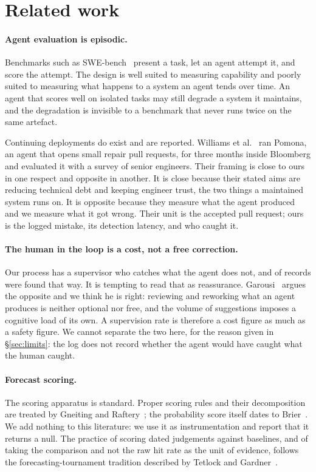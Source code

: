 \documentclass[11pt,a4paper]{article}
\begin{document}
\section{Related work}\label{sec:related}

\paragraph{Agent evaluation is episodic.} Benchmarks such as
SWE-bench~\cite{jimenez2024swebench} present a task, let an agent attempt it,
and score the attempt. The design is well suited to measuring capability and
poorly suited to measuring what happens to a system an agent tends over time.
An agent that scores well on isolated tasks may still degrade a system it
maintains, and the degradation is invisible to a benchmark that never runs
twice on the same artefact.

Continuing deployments do exist and are reported. Williams et
al.~\cite{williams2026pomona} ran Pomona, an agent that opens small repair
pull requests, for three months inside Bloomberg and evaluated it with a
survey of senior engineers. Their framing is close to ours in one respect and
opposite in another. It is close because their stated aims are reducing
technical debt and keeping engineer trust, the two things a maintained system
runs on. It is opposite because they measure what the agent produced and we
measure what it got wrong. Their unit is the accepted pull request; ours is
the logged mistake, its detection latency, and who caught it.

\paragraph{The human in the loop is a cost, not a free correction.} Our
process has a supervisor who catches what the agent does not, and \ErrHuman{}
of \ErrN{} records were found that way. It is tempting to read that as
reassurance. Garousi~\cite{garousi2026oversight} argues the opposite and we
think he is right: reviewing and reworking what an agent produces is neither
optional nor free, and the volume of suggestions imposes a cognitive load of
its own. A supervision rate is therefore a cost figure as much as a safety
figure. We cannot separate the two here, for the reason given in
\S\ref{sec:limits}: the log does not record whether the agent would have
caught what the human caught.

\paragraph{Forecast scoring.} The scoring apparatus is standard. Proper
scoring rules and their decomposition are treated by Gneiting and
Raftery~\cite{gneiting2007scoring}; the probability score itself dates to
Brier~\cite{brier1950}. We add nothing to this literature: we use it as
instrumentation and report that it returns a null. The practice of scoring
dated judgements against baselines, and of taking the comparison and not the
raw hit rate as the unit of evidence, follows the forecasting-tournament
tradition described by Tetlock and Gardner~\cite{tetlock2015}.
\end{document}
